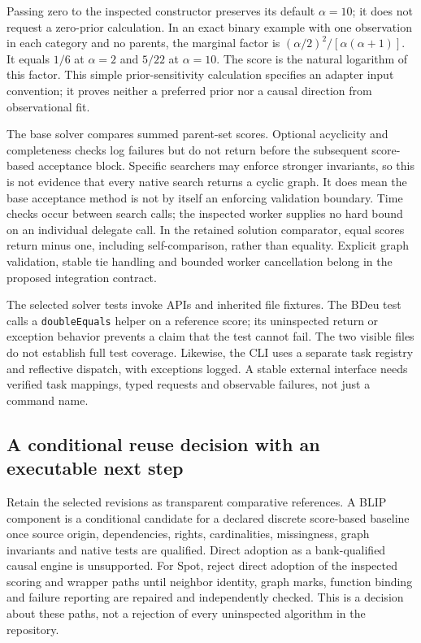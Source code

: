 Passing zero to the inspected constructor preserves its default $\alpha=10$;
it does not request a zero-prior calculation. In an exact binary example with
one observation in each category and no parents, the marginal factor is
$(\alpha/2)^2/[\alpha(\alpha+1)]$. It equals $1/6$ at $\alpha=2$ and $5/22$
at $\alpha=10$. The score is the natural logarithm of this factor. This simple
prior-sensitivity calculation specifies an adapter input convention; it proves
neither a preferred prior nor a causal direction from observational fit.
\citep{exec28_nested_reference}

The base solver compares summed parent-set scores. Optional acyclicity and
completeness checks log failures but do not return before the subsequent
score-based acceptance block. Specific searchers may enforce stronger
invariants, so this is not evidence that every native search returns a cyclic
graph. It does mean the base acceptance method is not by itself an enforcing
validation boundary. Time checks occur between search calls; the inspected
worker supplies no hard bound on an individual delegate call. In the retained
solution comparator, equal scores return minus one, including self-comparison,
rather than equality. Explicit graph validation, stable tie handling and
bounded worker cancellation belong in the proposed integration contract.
\citep{exec28_nested_sources,exec28_nested_reference}

The selected solver tests invoke APIs and inherited file fixtures. The BDeu
test calls a \texttt{doubleEquals} helper on a reference score; its uninspected
return or exception behavior prevents a claim that the test cannot fail. The
two visible files do not establish full test coverage. Likewise, the CLI uses
a separate task registry and reflective dispatch, with exceptions logged. A
stable external interface needs verified task mappings, typed requests and
observable failures, not just a command name.~\citep{exec28_nested_sources}

\subsection{A conditional reuse decision with an executable next step}
Retain the selected revisions as transparent comparative references. A BLIP
component is a conditional candidate for a declared discrete score-based
baseline once source origin, dependencies, rights, cardinalities, missingness,
graph invariants and native tests are qualified. Direct adoption as a
bank-qualified causal engine is unsupported. For Spot, reject direct adoption
of the inspected scoring and wrapper paths until neighbor identity, graph
marks, function binding and failure reporting are repaired and independently
checked. This is a decision about these paths, not a rejection of every
uninspected algorithm in the repository.~\citep{exec28_nested_sources}

